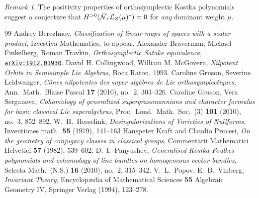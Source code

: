 \documentclass[12pt]{amsart}
\theoremstyle{definition}
\theoremstyle{remark}
\newtheorem{rem}[thm]{Remark}
\def\arxiv#1{\href{http://arxiv.org/abs/#1}{\tt arXiv:#1}} \let\arXiv\arxiv
\numberwithin{equation}{subsection}
\begin{document}
\begin{rem}
    The positivity properties of orthosymplectic Kostka polynomials~\cite[\S3.3]{BFT} suggest
    a conjecture that $H^{>0}(\Tilde{\mathcal{N}},\mathcal{L}_Z(\mu)^*)=0$ for {\em any}
    dominant weight $\mu$.
  \end{rem}
\begin{thebibliography}{99}
Andrey Berezhnoy, {\em Classification of linear maps of spaces with a scalar product},
Izvestiya Mathematics, to appear.
  Alexander Braverman, Michael Finkelberg, Roman Travkin, {\em Orthosymplectic Satake equivalence},
  \arxiv{1912.01930}.
  David H. Collingwood, William M. McGovern, {\em Nilpotent Orbits in Semisimple Lie Algebras}, Boca Raton, 1993.
Caroline Gruson, Severine Leidwanger, {\em C\^ones nilpotentes des super alg\`ebres
  de Lie orthosymplectiques}, Ann.\ Math.\ Blaise Pascal {\bf 17} (2010), no.~2, 303--326.
  Caroline Gruson, Vera Serganova, {\em Cohomology of generalized supergrassmannians and character
    formulas for basic classical Lie superalgebras}, Proc.\ Lond.\ Math.\ Soc.\ (3) {\bf 101} (2010),
  no.~3, 852--892.
  W.~H.~Hesselink, {\em Desingularizations of Varieties of Nullforms}, Inventiones math.\
  {\bf 55} (1979), 141--163 
  Hanspeter Kraft and Claudio Procesi, {\em On the geometry of conjugacy classes in classical groups},
  Commentarii Mathematici Helvetici {\bf 57} (1982), 539--602.
  D.~I.~Panyushev, {\em Generalised Kostka-Foulkes polynomials and cohomology of
    line bundles on homogeneous vector bundles}, Selecta Math.\ (N.S.) {\bf 16} (2010), no.~2,
  315--342.
  V.~L.~Popov, E.~B.~Vinberg, {\em Invariant Theory},
  Encyclop{\ae}dia of Mathematical Sciences {\bf 55} Algebraic Geometry IV, Springer Verlag
  (1994), 123--278.
\end{thebibliography}
\end{document}
